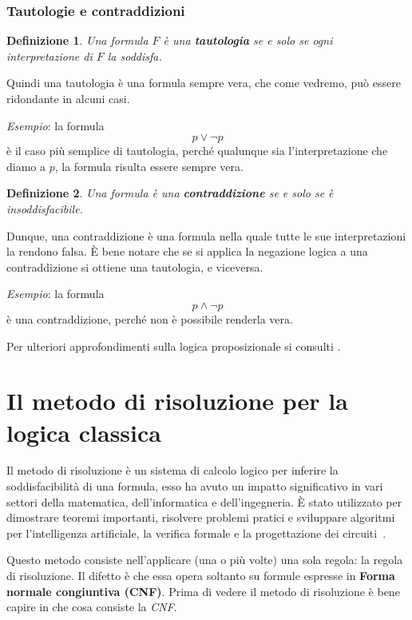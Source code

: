 \documentclass[a4paper,12pt]{report}
\newtheorem{definition}{Definizione}[section]
\begin{document}
\subsection{Tautologie e contraddizioni}
\label{taut-contr}
\begin{definition}
    Una formula $F$ è una \textbf{tautologia} se e solo se ogni interpretazione di $F$ la soddisfa.
\end{definition}
\noindent Quindi una tautologia è una formula sempre vera, che come vedremo, può essere ridondante in alcuni casi.

\emph{Esempio}: la formula
\[p \lor \lnot p\]
è il caso più semplice di tautologia, perché qualunque sia l'interpretazione che diamo a $p$, la formula risulta essere sempre vera.

\begin{definition}
    Una formula è una \textbf{contraddizione} se e solo se è insoddisfacibile.
\end{definition}
\noindent Dunque, una contraddizione è una formula nella quale tutte le sue interpretazioni la rendono falsa. \`E bene notare che se si applica la negazione logica a una contraddizione si ottiene una tautologia, e viceversa.

\emph{Esempio}: la formula
\[p \land \lnot p\]
è una contraddizione, perché non è possibile renderla vera.

Per ulteriori approfondimenti sulla logica proposizionale si consulti \cite{logica_prop}.

% 
% 
\chapter{Il metodo di risoluzione per la logica classica}
\label{resol}
Il metodo di risoluzione è un sistema di calcolo logico per inferire la soddisfacibilità di una formula, esso ha avuto un impatto significativo in vari settori della matematica, dell'informatica e dell'ingegneria. È stato utilizzato per dimostrare teoremi importanti, risolvere problemi pratici e sviluppare algoritmi per l'intelligenza artificiale, la verifica formale e la progettazione dei circuiti~\cite{res_calculus}.

Questo metodo consiste nell'applicare (una o più volte) una sola regola: la regola di risoluzione. Il difetto è che essa opera soltanto su formule espresse in \textbf{Forma normale congiuntiva (CNF)}. Prima di vedere il metodo di risoluzione è bene capire in che cosa consiste la \emph{CNF}.
\end{document}
